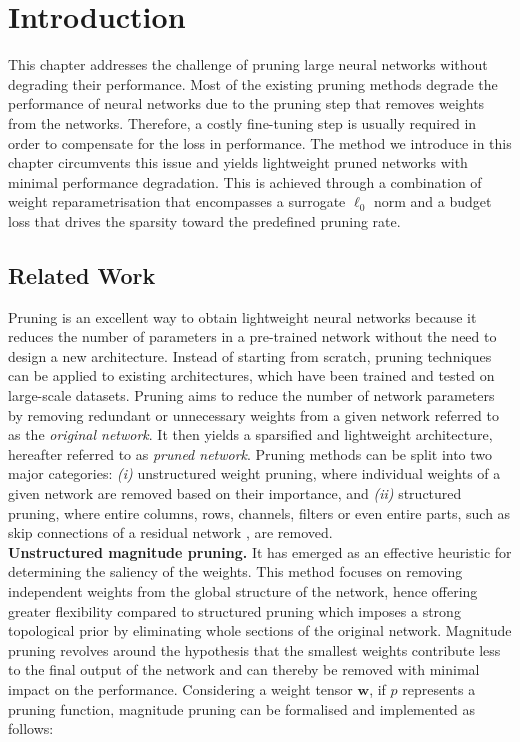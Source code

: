 \section{Introduction}

This chapter addresses the challenge of pruning large neural networks without
degrading their performance. Most of the existing pruning methods degrade the
performance of neural networks due to the pruning step that removes weights from
the networks. Therefore, a costly fine-tuning step is usually required in order
to compensate for the loss in performance. The method we introduce in this
chapter circumvents this issue and yields lightweight pruned networks with
minimal performance degradation. This is achieved through a combination of
weight reparametrisation that encompasses a surrogate $\ell_0$ norm and a budget
loss that drives the sparsity toward the predefined pruning rate.



\subsection{Related Work}

Pruning is an excellent way to obtain lightweight neural networks because it
reduces the number of parameters in a pre-trained network without the need to
design a new architecture. Instead of starting from scratch, pruning techniques
can be applied to existing architectures, which have been trained and tested on
large-scale datasets. Pruning aims to reduce the number of network parameters by
removing redundant or unnecessary weights from a given network referred to as
the \textit{original network}. It then yields a sparsified and lightweight
architecture, hereafter referred to as \textit{pruned network}. Pruning methods
can be split into two major categories: \textit{(i)} unstructured weight
pruning, where individual weights of a given network are removed based on their
importance, and \textit{(ii)} structured pruning, where entire columns, rows,
channels, filters or even entire parts, such as skip connections of a residual
network \cite{DBLP:conf/cvpr/HeZRS16}, are removed. \\


\noindent\textbf{Unstructured magnitude pruning.} It has emerged as an effective
heuristic for determining the saliency of the weights. This method focuses on
removing independent weights from the global structure of the network, hence
offering greater flexibility compared to structured pruning which imposes a
strong topological prior by eliminating whole sections of the original network.
Magnitude pruning revolves around the hypothesis that the smallest weights
contribute less to the final output of the network and can thereby be removed
with minimal impact on the performance. Considering a weight tensor
$\mathbf{w}$, if $p$ represents a pruning function, magnitude pruning can be
formalised and implemented as follows:\\

